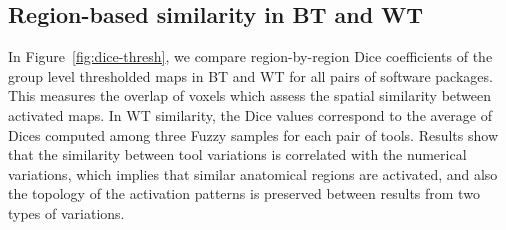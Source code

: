 \documentclass[runningheads]{llncs}
\begin{document}
\begin{figure}[b]
\end{figure}

\subsection{Region-based similarity in BT and WT}
In Figure~\ref{fig:dice-thresh}, we compare region-by-region Dice coefficients of
the group level thresholded maps in BT and WT for all pairs of software packages.
This measures the overlap of voxels which assess the spatial similarity between activated maps.
In WT similarity, the Dice values correspond to the average of Dices computed among three
Fuzzy samples for each pair of tools.
Results show that the similarity between tool variations is correlated with the numerical variations,
which implies that similar anatomical regions are activated, and also the topology of the activation patterns
is preserved between results from two types of variations.
\end{document}
